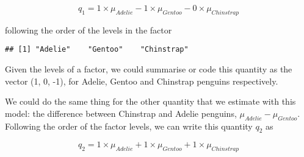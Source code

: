 \begin{equation}
q_1 = 1 \times \mu_{Adelie}   - 1 \times \mu_{Gentoo} - 0\times \mu_{Chinstrap}  
\end{equation}

following the order of the levels in the factor

\begin{knitrout}
\color{fgcolor}\begin{kframe}
\begin{alltt}
\hlopt{$}
\end{alltt}
\begin{verbatim}
## [1] "Adelie"    "Gentoo"    "Chinstrap"
\end{verbatim}
\end{kframe}
\end{knitrout}


Given the levels of a factor, we could summarise or code this quantity as the vector (1, 0, -1), for Adelie, Gentoo and Chinstrap penguins respectively.

We could do the same thing for the other quantity that we estimate with this model: the difference between Chinstrap and Adelie penguins, $\mu_{Adelie} - \mu_{Gentoo}$. Following the order of the factor levels, we can write this quantity $q_2$ as

\begin{equation}
q_2 = 1 \times \mu_{Adelie} + 1 \times \mu_{Gentoo} + 1 \times \mu_{Chinstrap}
\end{equation}







